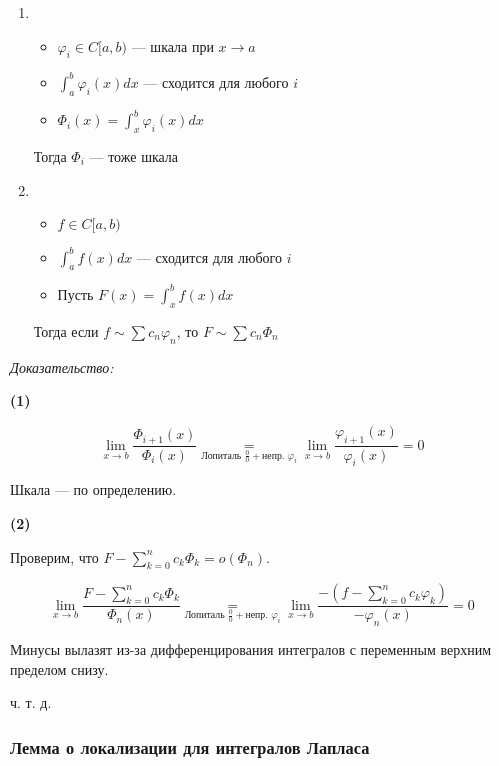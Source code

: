 \documentclass{article}
\def\eqby#1{\underset{#1}{=}}
\begin{document}
\begin{enumerate}
    \item 
        \begin{itemize}
            \item $\varphi_i \in C[a, b)$ --- шкала при $x \rightarrow a$
            \item $\int_a^b \varphi_i(x) dx$ --- сходится для любого $i$
            \item $\Phi_i(x) = \int_x^b \varphi_i(x) dx$
        \end{itemize}

        Тогда $\Phi_i$ --- тоже шкала

    \item     
        \begin{itemize}
            \item $f\in C[a, b)$
            \item $\int_a^b f(x) dx$ --- сходится для любого $i$
            \item Пусть $F(x) = \int_x^b f(x) dx$
        \end{itemize}

        Тогда если $f \sim \sum c_n \varphi_n$, то $F \sim \sum c_n \Phi_n$
\end{enumerate}

\textit{Доказательство:}

\textbf{(1)}

\[\lim_{x \rightarrow b}\frac{\Phi_{i + 1}(x)}{\Phi_{i}(x)} \eqby{\text{Лопиталь } \frac{0}{0} + \text{непр. }\varphi_i} \lim_{x \rightarrow b}\frac{\varphi_{i + 1}(x)}{\varphi_{i}(x)} = 0\]

Шкала --- по определению.

\textbf{(2)}

Проверим, что $F - \sum_{k = 0}^{n} c_k \Phi_{k} = o(\Phi_n)$.

\[\lim_{x \rightarrow b}\frac{F - \sum_{k = 0}^{n} c_{k} \Phi_{k}}{\Phi_{n}(x)} \eqby{\text{Лопиталь } \frac{0}{0} + \text{непр. }\varphi_i} \lim_{x \rightarrow b}\frac{-(f - \sum_{k = 0}^{n} c_{k} \varphi_{k})}{-\varphi_{n}(x)} = 0\]

Минусы вылазят из-за дифференцирования интегралов с переменным верхним пределом снизу.

ч. т. д. 


\subsubsection{Лемма о локализации для интегралов Лапласа}
\end{document}
